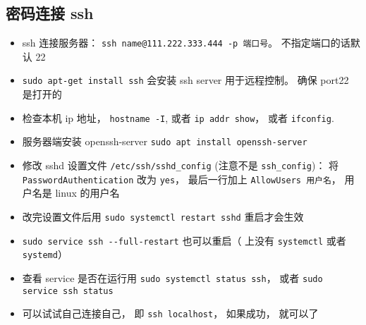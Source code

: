 
\subsection{密码连接 ssh}
\begin{itemize}
\item ssh 连接服务器： \verb`ssh name@111.222.333.444 -p 端口号`。 不指定端口的话默认 22
\item \verb`sudo apt-get install ssh` 会安装 ssh server 用于远程控制。 确保 port22 是打开的
\item 检查本机 ip 地址， \verb`hostname -I`, 或者 \verb`ip addr show`， 或者 \verb`ifconfig`.
\item 服务器端安装 openssh-server \verb`sudo apt install openssh-server`
\item 修改 sshd 设置文件 \verb`/etc/ssh/sshd_config` (注意不是 \verb`ssh_config`)： 将 \verb`PasswordAuthentication` 改为 \verb`yes`， 最后一行加上 \verb`AllowUsers 用户名`， 用户名是 linux 的用户名
\item 改完设置文件后用 \verb`sudo systemctl restart sshd` 重启才会生效
\item \verb`sudo service ssh --full-restart` 也可以重启（ 上没有 \verb`systemctl` 或者 \verb`systemd`）
\item 查看 service 是否在运行用  \verb`sudo systemctl status ssh`， 或者 \verb`sudo service ssh status`
\item 可以试试自己连接自己， 即 \verb`ssh localhost`， 如果成功， 就可以了
\end{itemize}

